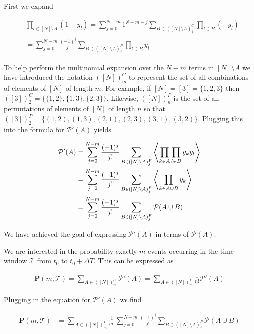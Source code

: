 \documentclass[12pt]{article}
\newcommand{\bv}[1]{\boldsymbol{#1}}
\begin{document}
First we expand 

\begin{align}
&\prod_{l \in [N] \setminus A}(1-y_l) = \sum_{j=0}^{N-m} 1^{N-m-j}\sum_{B \in ([N]\setminus A)^C_j} \prod_{l\in B}(-y_l)\\
&= \sum_{j=0}^{N-m}\frac{(-1)^j}{j!} \sum_{B\in([N]\setminus A)^P_j}\prod_{l \in B} y_l
\end{align}

To help perform the multinomial expansion over the $N-m$ terms in $[N]\setminus A$ we have introduced the notation $([N])_m^C$ to represent the set of all combinations of elements of $[N]$ of length $m$. For example, if $[N] = [3] = \{1,2,3\}$ then $([3])_2^C = \{\{1,2\},\{1,3\},\{2,3\} \}$. Likewise, $([N])_n^P$ is the set of all permutations of elements of $[N]$ of length $n$ so that $([3])_2^P = \{(1,2),(1,3),(2,1),(2,3),(3,1),(3,2) \}$. Plugging this into the formula for $\mathcal{P}'(A)$ yields

\begin{align}
\mathcal{P}'(A) &= \sum_{j=0}^{N-m} \frac{(-1)^j}{j!} \sum_{B \in ([N] \setminus A)_j^P} \Braket{\prod_{k\in A } \prod_{l \in B}  y_k y_l}\\
&= \sum_{j=0}^{N-m} \frac{(-1)^j}{j!} \sum_{B \in ([N] \setminus A)_j^P} \Braket{\prod_{k \in A \cup B} y_k}\\
&=\sum_{j=0}^{N-m} \frac{(-1)^j}{j!} \sum_{B \in ([N] \setminus A)_j^P} \mathcal{P}(A \cup B)
\end{align}

We have achieved the goal of expressing $\mathcal{P}'(A)$ in terms of $\mathcal{P}(A)$.


We are interested in the probability exactly $m$ events occurring in the time window $\mathcal{T}$ from $t_0$ to $t_0 + \Delta T$. This can be expressed as

\begin{align}
\label{Eq:Probn}
\bv{P}(m,\mathcal{T}) = \sum_{A \in ([N])_m^C} \mathcal{P}'(A) = \sum_{A \in ([N])_m^P} \frac{1}{n!}\mathcal{P}'(A)
\end{align}

Plugging in the equation for $\mathcal{P}'(A)$ we find

\begin{align}
\bv{P}(m,\mathcal{T}) &=\sum_{A \in ([N])_m^P} \frac{1}{m!} \sum_{j=0}^{N-m} \frac{(-1)^j}{j!} \sum_{B \in ([N] \setminus A)_j^P} \mathcal{P}(A \cup B)\\
\end{align}
\end{document}
